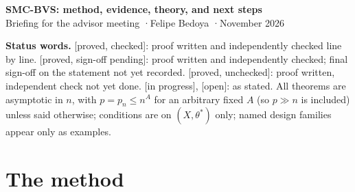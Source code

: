 \documentclass[10pt]{article}
\newcommand{\st}[1]{\textsf{\small[#1]}}
\begin{document}
\begin{center}
{\Large\bfseries SMC-BVS: method, evidence, theory, and next steps}\\[2pt]
{\small Briefing for the advisor meeting \quad·\quad Felipe Bedoya \quad·\quad November 2026}
\end{center}

\vspace{-4pt}

\textbf{Status words.} \st{proved, checked}: proof written and independently checked line by line.
\st{proved, sign-off pending}: proof written and independently checked; final sign-off on the statement not yet recorded.
\st{proved, unchecked}: proof written, independent check not yet done. \st{in progress}, \st{open}: as stated.
All theorems are asymptotic in $n$, with $p=p_n\le n^A$ for an arbitrary fixed $A$ (so $p\gg n$ is included) unless said otherwise;
conditions are on $(X,\theta^*)$ only; named design families appear only as examples.

\section{The method}
\end{document}
